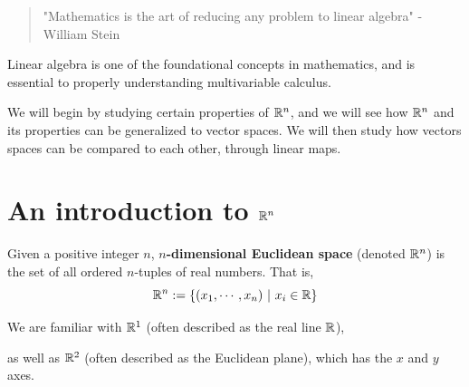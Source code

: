 
\begin{quote}
    "Mathematics is the art of reducing any problem to linear algebra" - William Stein
\end{quote}


Linear algebra is one of the foundational concepts in mathematics, and is essential to properly understanding multivariable calculus.

We will begin by studying certain properties of $\mathbb{R}^n$, and we will see how $\mathbb{R}^n$ and its properties can be generalized to vector spaces.  We will then study how vectors spaces can be compared to each other, through linear maps.


\section{An introduction to $\mathbb{R}^n$}

\begin{definition}
Given a positive integer $n$, \textbf{$n$-dimensional Euclidean space} (denoted $\mathbb{R}^n$) is the set of all ordered $n$-tuples of real numbers.  That is,
$$\mathbb{R}^n := \{(x_1, \cdots ,x_n) \ | \ x_i \in \mathbb{R}\}$$
\end{definition}

\begin{example}
    We are familiar with $\mathbb{R}^1$ (often described as the real line $\mathbb{R}$),
    
    \begin{center}
    \end{center}
    
    as well as $\mathbb{R}^2$ (often described as the Euclidean plane), which has the $x$ and $y$ axes.
    
    \begin{center}
                \begin{center}
        \end{center}
        \end{center}
    
\end{example}

